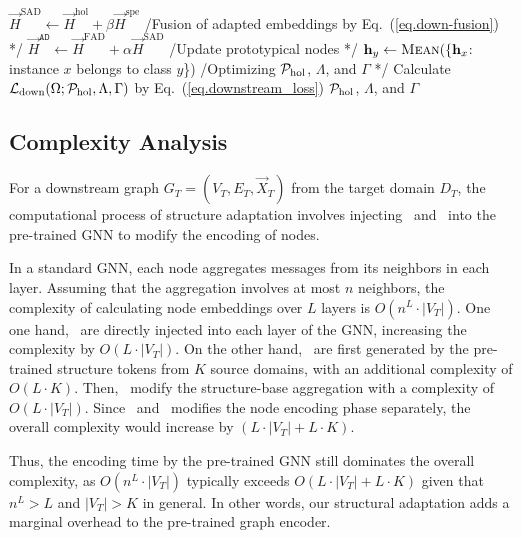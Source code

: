 \begin{algorithm}[b]
\begin{algorithmic}[1]
                \State $\vec{H}^\text{SAD} \leftarrow \vec{H}^\text{hol}+\beta\vec{H}^\text{spe}$
                \State \slash* Fusion of adapted embeddings by Eq.~(\ref{eq.down-fusion}) *\slash
                \State $\vec{H}^\mathtt{AD} \leftarrow \vec{H}^\text{FAD}+\alpha\vec{H}^\text{SAD}$
                \State \slash* Update prototypical nodes *\slash
                        \State ${\vec{h}}_{y} \leftarrow \textsc{Mean}(\{\vec{h}_{x}$: instance $x$ belongs to class $y$\})
                    \EndFor
                \State \slash* Optimizing $\bP_\text{hol}$, $\Lambda$, and $\Gamma$ *\slash
                \State Calculate $\bL_\text{down}(\Omega;\bP_\text{hol},\Lambda,\Gamma)$ by Eq.~(\ref{eq.downstream_loss})
        \EndFor
    \EndWhile 
    \State \Return $\bP_\text{hol}$, $\Lambda$, and $\Gamma$
\end{algorithmic}
\end{algorithm}

\subsection{Complexity Analysis}\label{complexity}
For a downstream graph \( G_T = (V_T, E_T, \vec{X}_T) \) from the target domain \( D_T \), the computational process of structure adaptation involves injecting \op\ and \cp\ into the pre-trained GNN to modify the encoding of nodes. 

In a standard GNN, each node aggregates messages from its neighbors in each layer. Assuming that the aggregation involves at most $n$ neighbors, the complexity of calculating node embeddings over $L$ layers is $O(n^L \cdot |V_T|)$. One one hand, \op\ are directly injected into each layer of the GNN, increasing the complexity by $O(L \cdot |V_T|)$. On the other hand, \cp\ are first generated by the pre-trained structure tokens from $K$ source domains, with an additional complexity of $O(L \cdot K)$. Then, \cp\ modify the structure-base aggregation with a complexity of $O(L \cdot |V_T|)$. Since \op\ and \cp\ modifies the node encoding phase separately, the overall complexity would increase by $(L \cdot |V_T| + L \cdot K)$.

Thus, the encoding time by the pre-trained GNN still dominates the overall complexity, as $O(n^L \cdot |V_T|)$ typically exceeds $O(L \cdot |V_T|+ L\cdot K)$ given that $n^L > L$ and $|V_T| > K$ in general. In other words, our structural adaptation adds a marginal overhead to the pre-trained graph encoder.



